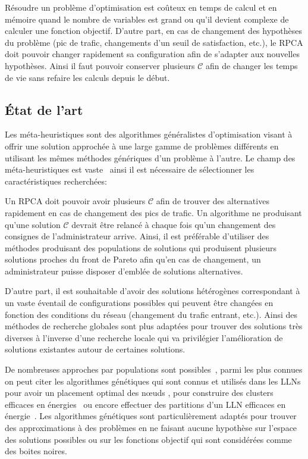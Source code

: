Résoudre un problème d'optimisation est coûteux en temps de calcul et en mémoire quand le nombre de variables est grand ou qu'il devient complexe de calculer une fonction objectif.
D'autre part, en cas de changement des hypothèses du problème (pic de trafic, changements d'un seuil de satisfaction, etc.), le \ac{RPCA} doit pouvoir changer rapidement sa configuration afin de s'adapter aux nouvelles hypothèses.
Ainsi il faut pouvoir conserver plusieurs $\mathcal{C}$ afin de changer les temps de vie sans refaire les calculs depuis le début.

\subsection{État de l'art}

Les méta-heuristiques sont des algorithmes généralistes d'optimisation visant à offrir une solution approchée à une large gamme de problèmes différents en utilisant les mêmes méthodes génériques d'un problème à l'autre.
Le champ des méta-heuristiques est vaste~\cite{sorensen2015metaheuristics,Luke2013Metaheuristics} ainsi il est nécessaire de sélectionner les caractéristiques recherchées:

Un \ac{RPCA} doit pouvoir avoir plusieurs $\mathcal{C}$ afin de trouver des alternatives rapidement en cas de changement des pics de trafic.
Un algorithme ne produisant qu'une solution $\mathcal{C}$ devrait être relancé à chaque fois qu'un changement des consignes de l'administrateur arrive.
Ainsi, il est préférable d'utiliser des méthodes produisant des populations de solutions qui produisent plusieurs solutions proches du front de Pareto afin qu'en cas de changement, un administrateur puisse disposer d'emblée de solutions alternatives.

D'autre part, il est souhaitable d'avoir des solutions hétérogènes correspondant à un vaste éventail de configurations possibles qui peuvent être changées en fonction des conditions du réseau (changement du trafic entrant, etc.).
Ainsi des méthodes de recherche globales sont plus adaptées pour trouver des solutions très diverses à l'inverse d'une recherche locale qui va privilégier l'amélioration de solutions existantes autour de certaines solutions.

De nombreuses approches par populations sont possibles~\cite{talbi2009metaheuristics}, parmi les plus connues on peut citer les algorithmes génétiques qui sont connus et utilisés dans les \ac{LLN}s pour avoir un placement optimal des nœuds \cite{ferentinos2007adaptive, jourdan2004multi}, pour construire des clusters efficaces en énergies~\cite{hussain2007genetic,abbasi2007survey} ou encore effectuer des partitions d'un \ac{LLN} efficaces en énergie~\cite{lai2007effective}.
Les algorithmes génétiques sont particulièrement adaptés pour trouver des approximations à des problèmes en ne faisant aucune hypothèse sur l'espace des solutions possibles ou sur les fonctions objectif qui sont considérées comme des boites noires.

